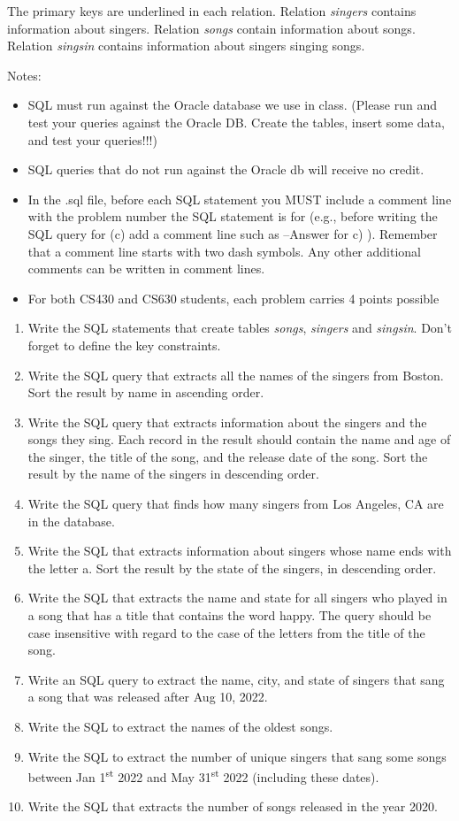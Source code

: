 \documentclass[letterpaper, 11pt]{article}
\begin{document}
The primary keys are underlined in each relation. Relation \textit{singers} contains information about singers. Relation \textit{songs} contain information about songs. Relation \textit{singsin} contains information about singers singing songs.

Notes:
\begin{itemize}
    \item SQL must run against the Oracle database we use in class. (Please run and test your queries against the Oracle DB. Create the tables, insert some data, and test your queries!!!)
    \item SQL queries that do not run against the Oracle db will receive no credit.
    \item In the .sql file, before each SQL statement you MUST include a comment line with the problem number the SQL statement is for (e.g., before writing the SQL query for (c) add a comment line such as --Answer for c) ). Remember that a comment line starts with two dash symbols. Any other additional comments can be written in comment lines.
    \item For both CS430 and CS630 students, each problem carries 4 points possible
\end{itemize}

\begin{enumerate}[label={\alph*})]
    \item Write the SQL statements that create tables \textit{songs}, \textit{singers} and \textit{singsin}. Don’t forget to define the key constraints.
    \item Write the SQL query that extracts all the names of the singers from Boston. Sort the result by name in ascending order.
    \item Write the SQL query that extracts information about the singers and the songs they sing. Each record in the result should contain the name and age of the singer, the title of the song, and the release date of the song. Sort the result by the name of the singers in descending order.
    \item Write the SQL query that finds how many singers from Los Angeles, CA are in the database.
    \item Write the SQL that extracts information about singers whose name ends with the letter a. Sort the result by the state of the singers, in descending order.
    \item Write the SQL that extracts the name and state for all singers who played in a song that has a title that contains the word happy. The query should be case insensitive with regard to the case of the letters from the title of the song.
    \item Write an SQL query to extract the name, city, and state of singers that sang a song that was released after Aug 10, 2022.
    \item Write the SQL to extract the names of the oldest songs.
    \item Write the SQL to extract the number of unique singers that sang some songs between Jan 1\textsuperscript{st} 2022 and May 31\textsuperscript{st} 2022 (including these dates).
    \item Write the SQL that extracts the number of songs released in the year 2020.
\end{enumerate}
\end{document}
